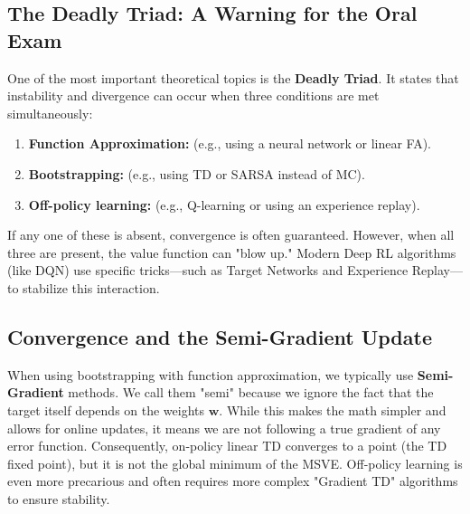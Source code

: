 \subsection{The Deadly Triad: A Warning for the Oral Exam}
One of the most important theoretical topics is the \textbf{Deadly Triad}. It states that instability and divergence can occur when three conditions are met simultaneously:
\begin{enumerate}
    \item \textbf{Function Approximation:} (e.g., using a neural network or linear FA).
    \item \textbf{Bootstrapping:} (e.g., using TD or SARSA instead of MC).
    \item \textbf{Off-policy learning:} (e.g., Q-learning or using an experience replay).
\end{enumerate}
If any one of these is absent, convergence is often guaranteed. However, when all three are present, the value function can "blow up." Modern Deep RL algorithms (like DQN) use specific tricks—such as Target Networks and Experience Replay—to stabilize this interaction.

\subsection{Convergence and the Semi-Gradient Update}
When using bootstrapping with function approximation, we typically use \textbf{Semi-Gradient} methods. We call them "semi" because we ignore the fact that the target itself depends on the weights $\mathbf{w}$. While this makes the math simpler and allows for online updates, it means we are not following a true gradient of any error function. Consequently, on-policy linear TD converges to a point (the TD fixed point), but it is not the global minimum of the MSVE. Off-policy learning is even more precarious and often requires more complex "Gradient TD" algorithms to ensure stability.
